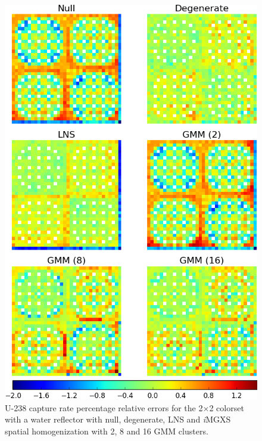 \documentclass[12pt,twoside]{mitthesis-exec}
\begin{document}
\begin{figure}[h!]
\centering
\includegraphics[width=0.9\linewidth]{figures/results/spatial/reflector/capt-err}
\vspace{2mm}
\caption[U-238 capture rate errors for the 2$\times$2 colorset with reflector]{U-238 capture rate percentage relative errors for the 2$\times$2 colorset with a water reflector with null, degenerate, LNS and \textit{i}MGXS spatial homogenization with 2, 8 and 16 GMM clusters.}
\label{fig:refl-capt-err}
\end{figure}
\end{document}
